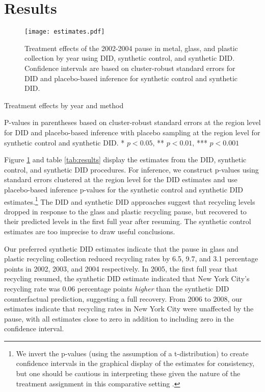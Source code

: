 \documentclass[12pt]{article}
\begin{document}
\section{Results}

\begin{figure}
    \centering
    \texttt{[image: estimates.pdf]}
    \caption{Treatment effects of the 2002-2004 pause in metal, glass, and plastic collection by year using DID, synthetic control, and synthetic DID.  Confidence intervals are based on cluster-robust standard errors for DID and placebo-based inference for synthetic control and synthetic DID.}
    \label{fig:results}
\end{figure}

\begin{table}
    \centering
    \begin{threeparttable}
    \caption{Treatment effects by year and method}
    \label{tab:results}
    
    \begin{tablenotes}[flushleft]
    \scriptsize{P-values in parentheses based on cluster-robust standard errors at the region level for DID and placebo-based inference with placebo sampling at the region level for synthetic control and synthetic DID. * \(p<0.05\), ** \(p<0.01\), *** \(p<0.001\)}
    \end{tablenotes}
    \end{threeparttable}
\end{table}

Figure \ref{fig:results} and table \ref{tab:results} display the estimates from the DID, synthetic control, and synthetic DID procedures.  For inference, we construct p-values using standard errors clustered at the region level for the DID estimates and use placebo-based inference p-values for the synthetic control and synthetic DID estimates.\footnote{We invert the p-values (using the assumption of a t-distribution) to create confidence intervals in the graphical display of the estimates for consistency, but one should be cautious in interpreting these given the nature of the treatment assignment in this comparative setting \citep{abadie2015}.}  The DID and synthetic DID approaches suggest that recycling levels dropped in response to the glass and plastic recycling pause, but recovered to their predicted levels in the first full year after resuming.  The synthetic control estimates are too imprecise to draw useful conclusions.

Our preferred synthetic DID estimates indicate that the pause in glass and plastic recycling collection reduced recycling rates by 6.5, 9.7, and 3.1 percentage points in 2002, 2003, and 2004 respectively.  In 2005, the first full year that recycling resumed, the synthetic DID estimate indicated that New York City's recycling rate was 0.06 percentage points \textit{higher} than the synthetic DID counterfactual prediction, suggesting a full recovery. From 2006 to 2008, our estimates indicate that recycling rates in New York City were unaffected by the pause, with all estimates close to zero in addition to including zero in the confidence interval.
\end{document}
